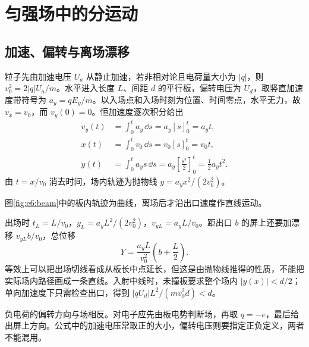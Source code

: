 \section{匀强场中的分运动}
\subsection{加速、偏转与离场漂移}

粒子先由加速电压 $U_a$ 从静止加速，若非相对论且电荷量大小为 $|q|$，则 $v_0^2=2|q|U_a/m$。水平进入长度 $L$、间距 $d$ 的平行板，偏转电压为 $U_d$，取竖直加速度带符号为 $a_y=qE_y/m$。以入场点和入场时刻为位置、时间零点，水平无力，故 $v_x=v_0$，而 $v_y(0)=0$。恒加速度逐次积分给出
\begin{align*}
v_y(t)&=\int_0^t a_y\,\dd s=a_y[s]_0^t=a_yt,\\
x(t)&=\int_0^t v_0\,\dd s=v_0[s]_0^t=v_0t,\\
y(t)&=\int_0^t a_ys\,\dd s
=a_y\left[\frac{s^2}{2}\right]_0^t=\frac12a_yt^2.
\end{align*}
由 $t=x/v_0$ 消去时间，场内轨迹为抛物线 $y=a_yx^2/(2v_0^2)$。

图\ref{fig:e6:beam}中的板内轨迹为曲线，离场后才沿出口速度作直线运动。

出场时 $t_L=L/v_0$，$y_L=a_yL^2/(2v_0^2)$，$v_{yL}=a_yL/v_0$。距出口 $b$ 的屏上还要加漂移 $v_{yL}b/v_0$，总位移
\[
 Y=\frac{a_yL}{v_0^2}\left(b+\frac L2\right).
\]
等效上可以把出场切线看成从板长中点延长，但这是由抛物线推得的性质，不能把实际场内路径画成一条直线。入射中线时，未撞板要求整个场内 $|y(x)|<d/2$；单向加速度下只需检查出口，得到 $|qU_d|L^2/(mv_0^2d)<d$。

负电荷的偏转方向与场相反。对电子应先由板电势判断场，再取 $q=-e$，最后给出屏上方向。公式中的加速电压常取正的大小，偏转电压则要指定正负定义，两者不能混用。

